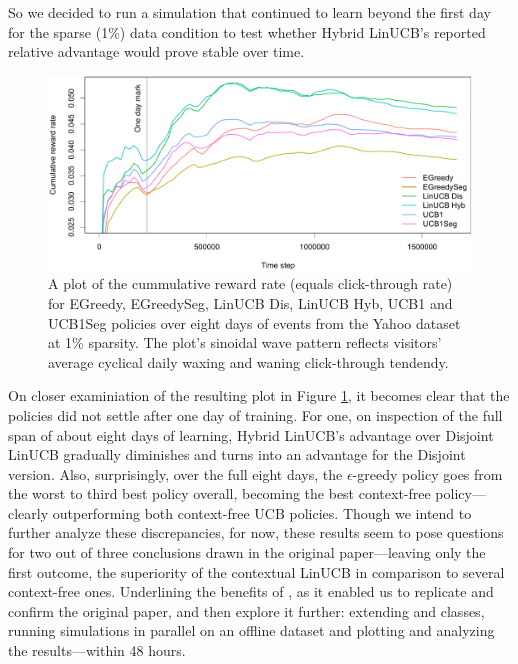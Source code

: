 \documentclass{jss}
\begin{document}
So we decided to run a simulation that continued to learn beyond the first day for the sparse (1\%) data condition to test whether Hybrid LinUCB's reported relative advantage would prove stable over time.

\begin{figure}[H]
  \centering
    \includegraphics[width=.99\textwidth]{fig/section_8_plot}
      \caption{A plot of the cummulative reward rate (equals click-through rate) for EGreedy, EGreedySeg, LinUCB Dis, LinUCB Hyb, UCB1 and UCB1Seg policies over eight days of events from the Yahoo dataset at 1\% sparsity. The plot's sinoidal wave pattern reflects visitors' average cyclical daily waxing and waning click-through tendendy.}
      \label{fig:section_8_plot}
\end{figure}

On closer examiniation of the resulting plot in Figure \ref{fig:section_8_plot}, it becomes clear that the policies did not settle after one day of training. For one, on inspection of the full span of about eight days of learning, Hybrid LinUCB's advantage over Disjoint LinUCB gradually diminishes and turns into an advantage for the Disjoint version. Also, surprisingly, over the full eight days, the $\epsilon$-greedy policy goes from the worst to third best policy overall, becoming the best context-free policy---clearly outperforming both context-free UCB policies. Though we intend to further analyze these discrepancies, for now, these results seem to pose questions for two out of three conclusions drawn in the original paper---leaving only the first outcome, the superiority of the contextual LinUCB in comparison to several context-free ones.  Underlining the benefits of , as it enabled us to replicate and confirm the original \cite{Li2010} paper, and then explore it further: extending  and  classes, running simulations in parallel on an offline dataset and plotting and analyzing the results---within 48 hours.
\end{document}
